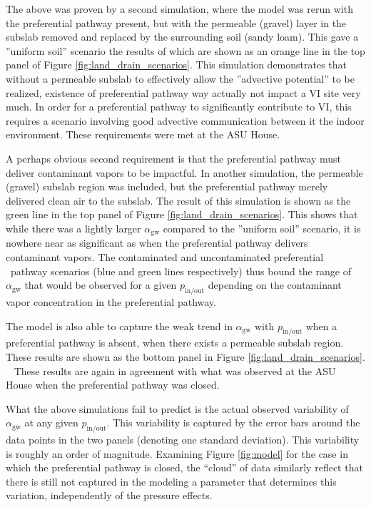 \documentclass[journal=esthag,manuscript=article]{achemso}
\begin{document}
The above was proven by a second simulation, where the model was rerun with the preferential pathway present, but with the permeable (gravel) layer in the subslab removed and replaced by the surrounding soil (sandy loam).
This gave a ”uniform soil” scenario the results of which are shown as an orange line in the top panel of Figure \ref{fig:land_drain_scenarios}.
This simulation demonstrates that without a permeable subslab to effectively allow the ”advective potential” to be realized, existence of preferential pathway way actually not impact a VI site very much.
In order for a preferential pathway to significantly contribute to VI, this requires a scenario involving good advective communication between it the indoor environment.
These requirements were met at the ASU House.\par

A perhaps obvious second requirement is that the preferential pathway must deliver contaminant vapors to be impactful.
In another simulation, the permeable (gravel) subslab region was included, but the preferential pathway merely delivered clean air to the subslab.
The result of this simulation is shown as the green line in the top panel of Figure \ref{fig:land_drain_scenarios}.
This shows that while there was a lightly larger $\alpha_\mathrm{gw}$ compared to the ”uniform soil” scenario, it is nowhere near as significant as when the preferential pathway delivers contaminant vapors.
The contaminated and uncontaminated preferential  pathway scenarios (blue and green lines respectively) thus bound the range of $\alpha_\mathrm{gw}$ that would be observed for a given $p_\mathrm{in/out}$ depending on the contaminant vapor concentration in the preferential pathway.\par

The model is also able to capture the weak trend in $\alpha_\mathrm{gw}$ with $p_\mathrm{in/out}$ when a preferential pathway is absent, when there exists a permeable subslab region.
These results are shown as the bottom panel in Figure \ref{fig:land_drain_scenarios}.  
These results are again in agreement with what was observed at the ASU House when the preferential pathway was closed.\par

What the above simulations fail to predict is the actual observed variability of $\alpha_\mathrm{gw}$ at any given $p_\mathrm{in/out}$.
This variability is captured by the error bars around the data points in the two panels (denoting one standard deviation).
This variability is roughly an order of magnitude.
Examining Figure \ref{fig:model} for the case in which the preferential pathway is closed, the “cloud” of data similarly reflect that there is still not captured in the modeling a parameter that determines this variation, independently of the pressure effects.\par
\end{document}
